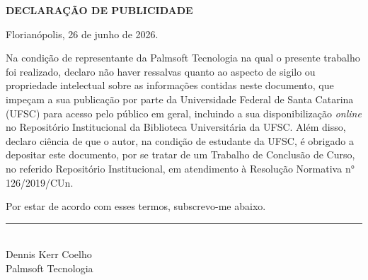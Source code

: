 \begin{center}
	\textbf{DECLARAÇÃO DE PUBLICIDADE}
\end{center}


Florianópolis, 26 de junho de 2026.

\vspace{1cm}

Na condição de representante da Palmsoft Tecnologia na qual o presente trabalho foi realizado, declaro não haver ressalvas quanto ao aspecto de sigilo ou propriedade intelectual sobre as informações contidas neste documento, que impeçam a sua publicação por parte da Universidade Federal de Santa Catarina (UFSC) para acesso pelo público em geral, incluindo a sua disponibilização \emph{online} no Repositório Institucional da Biblioteca Universitária da UFSC. Além disso, declaro ciência de que o autor, na condição de estudante da UFSC, é obrigado a depositar este documento, por se tratar de um Trabalho de Conclusão de Curso, no referido Repositório Institucional, em atendimento à Resolução Normativa n° 126/2019/CUn.

Por estar de acordo com esses termos, subscrevo-me abaixo.

\vspace{15mm}

\begin{center}
	\rule{7cm}{0.7pt} \\
	Dennis Kerr Coelho \\
	Palmsoft Tecnologia
\end{center}

\cleardoublepage


